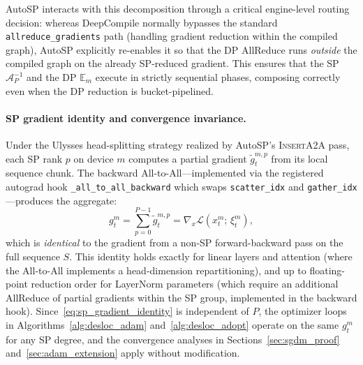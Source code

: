 \documentclass{article}
\begin{document}
AutoSP interacts with this decomposition through a critical engine-level routing decision:
whereas DeepCompile normally bypasses the standard \texttt{allreduce\_gradients} path
(handling gradient reduction within the compiled graph), AutoSP explicitly re-enables it
so that the DP AllReduce runs \emph{outside} the compiled graph on the already SP-reduced
gradient. This ensures that the SP $\mathcal{A}_P^{-1}$ and the DP $\mathbb{E}_m$ execute
in strictly sequential phases, composing correctly even when the DP reduction is
bucket-pipelined.

\paragraph{SP gradient identity and convergence invariance.}
Under the Ulysses head-splitting strategy realized by AutoSP's
\textsc{InsertA2A} pass, each SP rank $p$ on device $m$ computes a partial
gradient $\tilde{g}^{m,p}_t$ from its local sequence chunk.
The backward All-to-All---implemented via the registered autograd hook
\texttt{\_all\_to\_all\_backward} which swaps \texttt{scatter\_idx} and
\texttt{gather\_idx}---produces the aggregate:
\begin{equation}
g^m_t = \sum_{p=0}^{P-1} \tilde{g}^{m,p}_t = \nabla_x \mathcal{L}(x^m_t;\, \xi^m_t),
\label{eq:sp_gradient_identity}
\end{equation}
which is \emph{identical} to the gradient from a non-SP forward-backward pass on the
full sequence $S$.
This identity holds exactly for linear layers and attention (where the All-to-All
implements a head-dimension repartitioning), and up to floating-point reduction
order for LayerNorm parameters (which require an additional AllReduce of partial
gradients within the SP group, implemented in the backward hook).
Since~\eqref{eq:sp_gradient_identity} is independent of $P$, the optimizer loops
in Algorithms~\ref{alg:desloc_adam} and~\ref{alg:desloc_adopt} operate on the same
$g^m_t$ for any SP degree, and the convergence analyses in
Sections~\ref{sec:sgdm_proof} and~\ref{sec:adam_extension} apply without modification.
\end{document}

